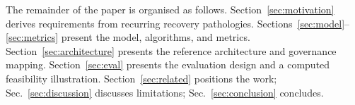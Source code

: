 The remainder of the paper is organised as follows. Section~\ref{sec:motivation} derives requirements from recurring recovery pathologies. Sections~\ref{sec:model}--\ref{sec:metrics} present the model, algorithms, and metrics. Section~\ref{sec:architecture} presents the reference architecture and governance mapping. Section~\ref{sec:eval} presents the evaluation design and a computed feasibility illustration. Section~\ref{sec:related} positions the work; Sec.~\ref{sec:discussion} discusses limitations; Sec.~\ref{sec:conclusion} concludes.
